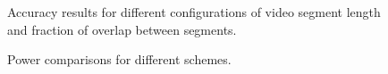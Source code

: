 \begin{figure}[ht!]
\centering
{}
\caption{\label{fig:ActionRecognition} Accuracy results for different configurations of video segment length and fraction of overlap between segments.}
\end{figure}

\begin{figure}[ht!]
\centering
{}
\caption{\label{fig:PowerResults} Power comparisons for different schemes.}
\end{figure}

